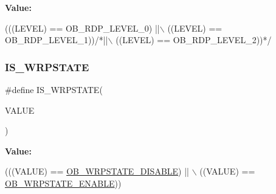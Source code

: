 {\bfseries Value\+:}
\begin{DoxyCode}
(((LEVEL) == OB\_RDP\_LEVEL\_0)   ||\(\backslash\)
                                    ((LEVEL) == OB\_RDP\_LEVEL\_1))\textcolor{comment}{/*||\(\backslash\)}
\textcolor{comment}{                                    ((LEVEL) == OB\_RDP\_LEVEL\_2))*/}
\end{DoxyCode}
\mbox{\label{group___f_l_a_s_h_ex___private___macros_ga8164622401a6cacf006679166de93c21}} 
\subsubsection{\texorpdfstring{I\+S\+\_\+\+W\+R\+P\+S\+T\+A\+TE}{IS\_WRPSTATE}}
{\footnotesize\ttfamily \#define I\+S\+\_\+\+W\+R\+P\+S\+T\+A\+TE(\begin{DoxyParamCaption}\item[{}]{V\+A\+L\+UE }\end{DoxyParamCaption})}

{\bfseries Value\+:}
\begin{DoxyCode}
(((VALUE) == \hyperlink{group___f_l_a_s_h_ex___o_b___w_r_p___state_gaa34eb6205fe554f65a311ee974d5a4ab}{OB\_WRPSTATE\_DISABLE}) || \(\backslash\)
                            ((VALUE) == \hyperlink{group___f_l_a_s_h_ex___o_b___w_r_p___state_ga9fc463145ab57616baa36d95523186a1}{OB\_WRPSTATE\_ENABLE}))
\end{DoxyCode}

